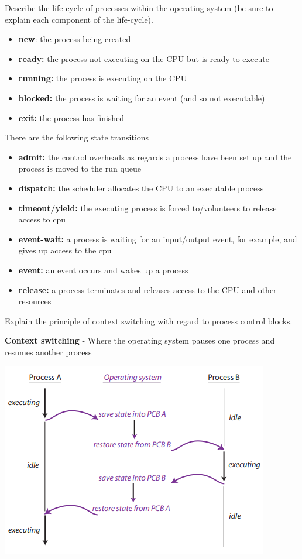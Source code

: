 \documentclass{exam}
\begin{document}
\begin{questions}
\question[10]Describe the life-cycle of processes within the operating system (be sure to explain each component of the life-cycle).
\begin{solution}[2in]
\begin{itemize}
	\item \textbf{new}: the process being created
	\item \textbf{ready:} the process not executing on the CPU but is ready to execute
	\item \textbf{running:} the process is executing on the CPU
	\item \textbf{blocked:} the process is waiting for an event (and so not executable)
	\item \textbf{exit:} the process has finished
\end{itemize}
There are the following state transitions
\begin{itemize}
	\item \textbf{admit:} the control overheads as regards a process have been set up and the process is moved to the run queue
	\item \textbf{dispatch:} the scheduler allocates the CPU to an executable process
	\item \textbf{timeout/yield:} the executing process is forced to/volunteers to release access to cpu
	\item \textbf{event-wait:} a process is waiting for an input/output event, for example, and gives up access to the cpu
	\item \textbf{event:} an event occurs and wakes up a process
	\item \textbf{release:} a process terminates and releases access to the CPU and other resources
\end{itemize}
\end{solution}


\newpage
\question[5]Explain the principle of context switching with regard to process control blocks.
\begin{solution}[2in]
\textbf{Context switching} - Where the operating system pauses one process and resumes another process
\begin{center}
	\includegraphics[scale=0.7]{context_switching}
\end{center}
\end{solution}


\end{questions}
\end{document}
